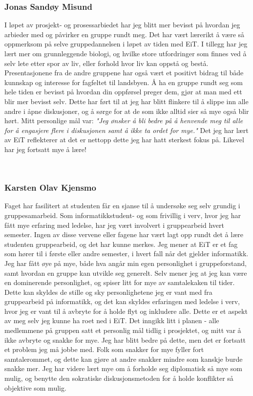 \subsubsection{Jonas Sandøy Misund}
I løpet av prosjekt- og prosessarbiedet har jeg blitt mer bevisst på hvordan jeg arbieder med og påvirker en gruppe rundt meg.
Det har vært lærerikt å være så oppmerksom på selve gruppedannelsen i løpet av tiden med EiT.
I tillegg har jeg lært mer om grunnleggende biologi, og hvilke store utfordringer som finnes ved å selv lete etter spor av liv, eller forhold hvor liv kan oppstå og bestå.
Presentasjonene fra de andre gruppene har også vært et positivt bidrag til både kunnskap og interesse for fagfeltet til landsbyen.
Å ha en gruppe rundt seg som hele tiden er bevisst på hvordan din oppførsel preger dem, gjør at man med ett blir mer bevisst selv.
Dette har ført til at jeg har blitt flinkere til å slippe inn alle andre i åpne diskusjoner, og å sørge for at de som ikke alltid sier så mye også blir hørt.
Mitt personlige mål var: \emph{"Jeg ønsker å bli bedre på å henvende meg til alle for å engasjere flere i diskusjonen samt å ikke ta ordet for mye."}
Det jeg har lært av EiT reflekterer at det er nettopp dette jeg har hatt sterkest fokus på.
Likevel har jeg fortsatt mye å lære!

\\
\subsubsection{Karsten Olav Kjensmo}
Faget har fasilitert at studenten får en sjanse til å undersøke seg selv grundig i gruppesamarbeid. 
Som informatikkstudent- og som frivillig i verv, hvor jeg har fått mye erfaring med ledelse, har jeg vært involvert i gruppearbeid hvert semester. 
Ingen av disse vervene eller fagene har vært lagt opp rundt det å lære studenten gruppearbeid, og det har kunne merkes. 
Jeg mener at EiT er et fag som hører til i første eller andre semester, i hvert fall når det gjelder informatikk. 
Jeg har fått øye på mye, både hva angår min egen personlighet i gruppeforstand, samt hvordan en gruppe kan utvikle seg generelt. 
Selv mener jeg at jeg kan være en dominerende personlighet, og spiser litt for mye av samtalekaken til tider. 
Dette kan skyldes de stille og sky personlighetene jeg er vant med fra gruppearbeid på informatikk, og det kan skyldes erfaringen med ledelse i verv, hvor jeg er vant til å avbryte for å holde flyt og inkludere alle. 
Dette er et aspekt av meg selv jeg kunne ha roet ned i EiT. Det inngikk litt i planen - alle medlemmene på gruppen satt et personlig mål tidlig i prosjektet, og mitt var å ikke avbryte og snakke for mye. 
Jeg har blitt bedre på dette, men det er fortsatt et problem jeg må jobbe med. 
Folk som snakker for mye fyller fort samtalerommet, og dette kan gjøre at andre snakker mindre som kanskje burde snakke mer. 
Jeg har videre lært mye om å forholde seg diplomatisk så mye som mulig, og benytte den sokratiske diskusjonsmetoden for å holde konflikter så objektive som mulig.\\

